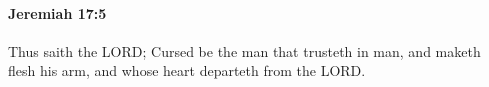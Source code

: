 
		\paragraph{Jeremiah 17:5} %
			\label{JEREMIAH-17-5}

			Thus saith the LORD; Cursed be the man that trusteth in man, and maketh flesh his arm, and whose heart departeth from the LORD.


